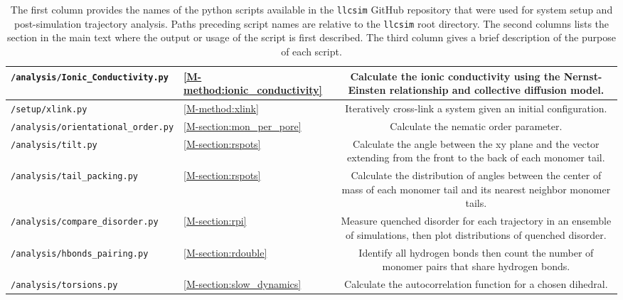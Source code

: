 \documentclass{article}
\begin{document}
\begin{table}[htb!]
\begin{tabular}{|A|B|C|}
  \texttt{/analysis/Ionic\_Conductivity.py} & \ref{M-method:ionic_conductivity} & Calculate the 
  ionic conductivity using the Nernst-Einsten relationship and collective diffusion model. \\ \hline
  
  \texttt{/setup/xlink.py} & \ref{M-method:xlink} & Iteratively cross-link a system given an 
  initial configuration. \\ \hline
    
  \texttt{/analysis/orientational\_order.py} & \ref{M-section:mon_per_pore} & Calculate the 
  nematic order parameter. \\ \hline
  
  \texttt{/analysis/tilt.py} & \ref{M-section:rspots} & Calculate the angle between the xy plane
  and the vector extending from the front to the back of each monomer tail. \\ \hline
  
  \texttt{/analysis/tail\_packing.py} & \ref{M-section:rspots} & Calculate the distribution of
  angles between the center of mass of each monomer tail and its nearest neighbor monomer tails.
  \\ \hline
 
  \texttt{/analysis/compare\_disorder.py} & \ref{M-section:rpi} & Measure quenched disorder for
  each trajectory in an ensemble of simulations, then plot distributions of quenched disorder.
  \\ \hline
  
  \texttt{/analysis/hbonds\_pairing.py} & \ref{M-section:rdouble} & Identify all hydrogen bonds
  then count the number of monomer pairs that share hydrogen bonds. \\ \hline
  
  \texttt{/analysis/torsions.py} & \ref{M-section:slow_dynamics} & Calculate the autocorrelation
  function for a chosen dihedral. \\ \hline
  
  \end{tabular}
  
  \caption{The first column provides the names of the python scripts available in
  the \texttt{llcsim} GitHub repository that were used for system setup and post-simulation 
  trajectory analysis. Paths preceding script names are relative to the 
  \texttt{llcsim} root directory. The second columns lists the section in the main
  text where the output or usage of the script is first described. The third column
  gives a brief description of the purpose of each script.
  }~\label{table:python_scripts}
  
  \end{table}
  
\end{document}
